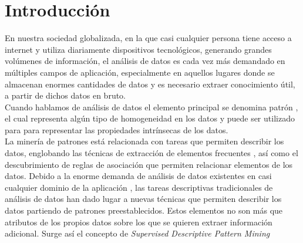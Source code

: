 \documentclass[a4paper, 12pt]{book}
\newcommand{\excluirpagina}[1]{\addtocounter{page}{-1}} %
\begin{document}

\newpage
\thispagestyle{fancy} 
\excluirpagina

\tableofcontents
\newpage

\listoffigures

\newpage
\listoftables



\newpage
\pagestyle{cuerpo}
\thispagestyle{cuerpo}
\setcounter{page}{1}

\section{Introducción}

En nuestra sociedad globalizada, en la que casi cualquier persona tiene acceso a internet y utiliza diariamente dispositivos tecnológicos, generando grandes volúmenes de información, el análisis de datos es cada vez más demandado en múltiples campos de aplicación, especialmente en aquellos lugares donde se almacenan enormes cantidades de datos y es necesario extraer conocimiento útil, a partir de dichos datos en bruto.\\

Cuando hablamos de análisis de datos el elemento principal se denomina patrón \cite{}, el cual representa algún tipo de homogeneidad en los datos y puede ser utilizado para para representar las propiedades intrínsecas de los datos.\\

La minería de patrones está relacionada con tareas que permiten describir los datos, englobando las técnicas de extracción de elementos frecuentes , así como el descubrimiento de reglas de asociación que permiten relacionar elementos de los datos. Debido a la enorme demanda de análisis de datos existentes en casi cualquier dominio de la aplicación , las tareas descriptivas tradicionales de análisis de datos han dado lugar a nuevas técnicas que permiten describir los datos partiendo de patrones preestablecidos. Estos elementos no son más que atributos de los propios datos sobre los que se quieren extraer información adicional. Surge así el concepto de \textit{Supervised Descriptive Pattern Mining} \cite{}\\
\end{document}
